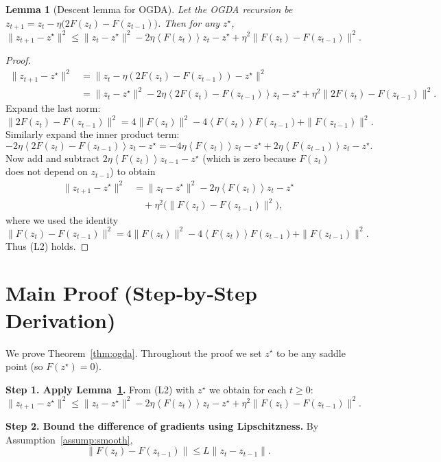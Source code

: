 \documentclass[11pt]{article}
\newtheorem{lemma}{Lemma}
\newcommand{\inner}[1]{\left\langle#1\right\rangle}
\begin{document}
\begin{lemma}[Descent lemma for OGDA]\label{lem:descent}
Let the OGDA recursion be $z_{t+1}=z_t-\eta\bigl(2F(z_t)-F(z_{t-1})\bigr)$. Then for any $z^\star$,
\[
\|z_{t+1}-z^\star\|^2
\le\|z_t-z^\star\|^2-2\eta\inner{F(z_t)}{z_t-z^\star}
+\eta^2\|F(z_t)-F(z_{t-1})\|^2.
\tag{L2}
\]
\end{lemma}
\begin{proof}
\[
\begin{aligned}
\|z_{t+1}-z^\star\|^2
&=\|z_t-\eta(2F(z_t)-F(z_{t-1}))-z^\star\|^2\\
&=\|z_t-z^\star\|^2-2\eta\inner{2F(z_t)-F(z_{t-1})}{z_t-z^\star}
   +\eta^2\|2F(z_t)-F(z_{t-1})\|^2.
\end{aligned}
\]
Expand the last norm:
\[
\|2F(z_t)-F(z_{t-1})\|^2
=4\|F(z_t)\|^2-4\inner{F(z_t)}{F(z_{t-1})}+\|F(z_{t-1})\|^2.
\]
Similarly expand the inner product term:
\[
-2\eta\inner{2F(z_t)-F(z_{t-1})}{z_t-z^\star}
=-4\eta\inner{F(z_t)}{z_t-z^\star}+2\eta\inner{F(z_{t-1})}{z_t-z^\star}.
\]
Now add and subtract $2\eta\inner{F(z_t)}{z_{t-1}-z^\star}$ (which is zero because $F(z_t)$ does not depend on $z_{t-1}$) to obtain
\[
\begin{aligned}
\|z_{t+1}-z^\star\|^2
&=\|z_t-z^\star\|^2-2\eta\inner{F(z_t)}{z_t-z^\star}\\
&\quad+\eta^2\bigl(\|F(z_t)-F(z_{t-1})\|^2\bigl),
\end{aligned}
\]
where we used the identity
\[
\|F(z_t)-F(z_{t-1})\|^2
=4\|F(z_t)\|^2-4\inner{F(z_t)}{F(z_{t-1})}+\|F(z_{t-1})\|^2.
\]
Thus (L2) holds. \qedhere
\end{proof}

\section*{Main Proof (Step‑by‑Step Derivation)}
We prove Theorem~\ref{thm:ogda}. Throughout the proof we set $z^\star$ to be any saddle point (so $F(z^\star)=0$).

\bigskip
\noindent\textbf{Step 1. Apply Lemma~\ref{lem:descent}.}  
From (L2) with $z^\star$ we obtain for each $t\ge0$:
\[
\|z_{t+1}-z^\star\|^2
\le\|z_t-z^\star\|^2-2\eta\inner{F(z_t)}{z_t-z^\star}
+\eta^2\|F(z_t)-F(z_{t-1})\|^2.
\tag{S1}
\]

\noindent\textbf{Step 2. Bound the difference of gradients using Lipschitzness.}  
By Assumption~\ref{assump:smooth},
\[
\|F(z_t)-F(z_{t-1})\|\le L\|z_t-z_{t-1}\|.
\tag{S2}
\]
\end{document}
